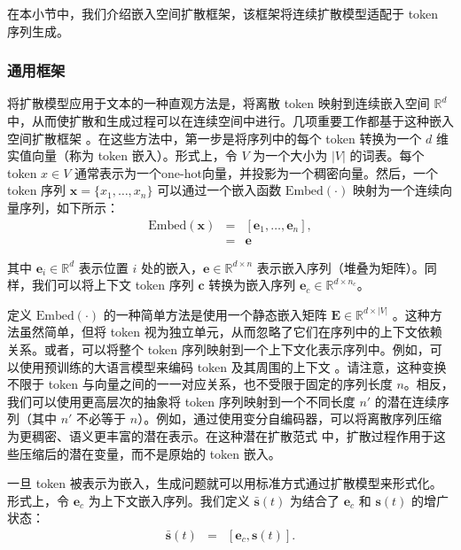在本小节中，我们介绍嵌入空间扩散框架，该框架将连续扩散模型适配于 token 序列生成。

\subsubsection{通用框架}

将扩散模型应用于文本的一种直观方法是，将离散 token 映射到连续嵌入空间 $\mathbb{R}^d$ 中，从而使扩散和生成过程可以在连续空间中进行。几项重要工作都基于这种嵌入空间扩散框架 \citep{li-etal:2022diffusion,strudel-etal:2022self,gong-etal:2023diffuseq}。在这些方法中，第一步是将序列中的每个 token 转换为一个 $d$ 维实值向量（称为 token 嵌入）。形式上，令 $V$ 为一个大小为 $|V|$ 的词表。每个 token $x \in V$ 通常表示为一个one-hot向量，并投影为一个稠密向量。然后，一个 token 序列 $\mathbf{x} = \{x_1, \dots, x_n\}$ 可以通过一个嵌入函数 $\mathrm{Embed}(\cdot)$ 映射为一个连续向量序列，如下所示：
\begin{eqnarray}
\mathrm{Embed}(\mathbf{x}) & = & [\mathbf{e}_1,\dots,\mathbf{e}_n], \nonumber \\
& = & \mathbf{e}
\end{eqnarray}

\noindent 其中 $\mathbf{e}_i \in \mathbb{R}^d$ 表示位置 $i$ 处的嵌入，$\mathbf{e} \in \mathbb{R}^{d \times n}$ 表示嵌入序列（堆叠为矩阵）。同样，我们可以将上下文 token 序列 $\mathbf{c}$ 转换为嵌入序列 $\mathbf{e}_{c} \in \mathbb{R}^{d \times n_c}$。

定义 $\mathrm{Embed}(\cdot)$ 的一种简单方法是使用一个静态嵌入矩阵 $\mathbf{E} \in \mathbb{R}^{d \times |V|}$ \citep{mikolov-etal:2013efficient,mikolov-etal:2013distributed}。这种方法虽然简单，但将 token 视为独立单元，从而忽略了它们在序列中的上下文依赖关系。或者，可以将整个 token 序列映射到一个上下文化表示序列中。例如，可以使用预训练的大语言模型来编码 token 及其周围的上下文 \citep{devlin-etal:2019bert,brown-etal:2020language}。请注意，这种变换不限于 token 与向量之间的一一对应关系，也不受限于固定的序列长度 $n$。相反，我们可以使用更高层次的抽象将 token 序列映射到一个不同长度 $n'$ 的潜在连续序列（其中 $n'$ 不必等于 $n$）。例如，通过使用变分自编码器，可以将离散序列压缩为更稠密、语义更丰富的潜在表示。在这种潜在扩散范式 \citep{rombach-etal:2022high} 中，扩散过程作用于这些压缩后的潜在变量，而不是原始的 token 嵌入。

一旦 token 被表示为嵌入，生成问题就可以用标准方式通过扩散模型来形式化。形式上，令 $\mathbf{e}_c$ 为上下文嵌入序列。我们定义 $\bar{\mathbf{s}}(t)$ 为结合了 $\mathbf{e}_c$ 和 $\mathbf{s}(t)$ 的增广状态：
\begin{eqnarray}
\bar{\mathbf{s}}(t) & = & [\mathbf{e}_c, \mathbf{s}(t)].
\end{eqnarray}

